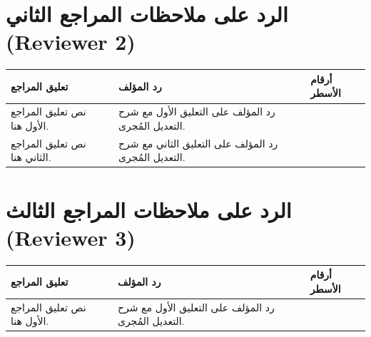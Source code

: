 \documentclass[11pt,a4paper]{article}
\begin{document}
\section{الرد على ملاحظات المراجع الثاني (Reviewer 2)}


\begin{table}[H]
\centering
\small
\begin{tabularx}{\textwidth}{L{5cm} Y L{2.5cm}}
\toprule
\textbf{تعليق المراجع} & \textbf{رد المؤلف} & \textbf{أرقام الأسطر} \\
\midrule
 نص تعليق المراجع الأول هنا.
& %
رد المؤلف على التعليق الأول مع شرح التعديل المُجرى.
&  \\
\midrule
 نص تعليق المراجع الثاني هنا.
& %
رد المؤلف على التعليق الثاني مع شرح التعديل المُجرى.
&  \\
\bottomrule
\end{tabularx}
\end{table}

\section{الرد على ملاحظات المراجع الثالث (Reviewer 3)}


\begin{table}[H]
\centering
\small
\begin{tabularx}{\textwidth}{L{5cm} Y L{2.5cm}}
\toprule
\textbf{تعليق المراجع} & \textbf{رد المؤلف} & \textbf{أرقام الأسطر} \\
\midrule
 نص تعليق المراجع الأول هنا.
& %
رد المؤلف على التعليق الأول مع شرح التعديل المُجرى.
&  \\
\bottomrule
\end{tabularx}
\end{table}

\end{document}
